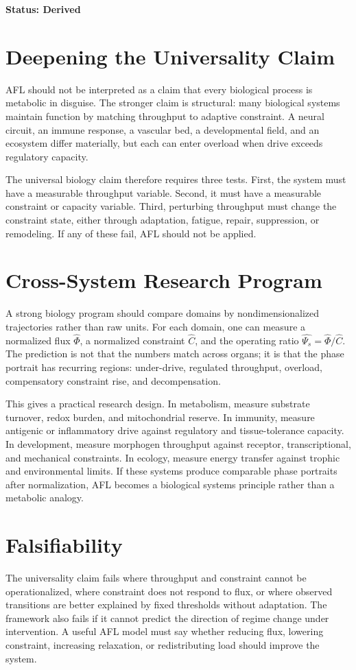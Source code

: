 \documentclass[11pt]{article}
\begin{document}
\textbf{Status: Derived}


\section{Deepening the Universality Claim}
AFL should not be interpreted as a claim that every biological process is metabolic in disguise. The stronger claim is structural: many biological systems maintain function by matching throughput to adaptive constraint. A neural circuit, an immune response, a vascular bed, a developmental field, and an ecosystem differ materially, but each can enter overload when drive exceeds regulatory capacity.

The universal biology claim therefore requires three tests. First, the system must have a measurable throughput variable. Second, it must have a measurable constraint or capacity variable. Third, perturbing throughput must change the constraint state, either through adaptation, fatigue, repair, suppression, or remodeling. If any of these fail, AFL should not be applied.

\section{Cross-System Research Program}
A strong biology program should compare domains by nondimensionalized trajectories rather than raw units. For each domain, one can measure a normalized flux $\widehat{\Phi}$, a normalized constraint $\widehat{C}$, and the operating ratio $\widehat{\Psi_s}=\widehat{\Phi}/\widehat{C}$. The prediction is not that the numbers match across organs; it is that the phase portrait has recurring regions: under-drive, regulated throughput, overload, compensatory constraint rise, and decompensation.

This gives a practical research design. In metabolism, measure substrate turnover, redox burden, and mitochondrial reserve. In immunity, measure antigenic or inflammatory drive against regulatory and tissue-tolerance capacity. In development, measure morphogen throughput against receptor, transcriptional, and mechanical constraints. In ecology, measure energy transfer against trophic and environmental limits. If these systems produce comparable phase portraits after normalization, AFL becomes a biological systems principle rather than a metabolic analogy.

\section{Falsifiability}
The universality claim fails where throughput and constraint cannot be operationalized, where constraint does not respond to flux, or where observed transitions are better explained by fixed thresholds without adaptation. The framework also fails if it cannot predict the direction of regime change under intervention. A useful AFL model must say whether reducing flux, lowering constraint, increasing relaxation, or redistributing load should improve the system.
\end{document}

